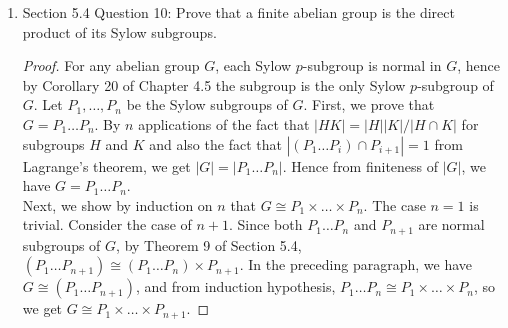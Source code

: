 \documentclass{article}
\begin{document}
\begin{enumerate}[label={\bf Q\arabic*:}]
\begin{proof}
      Now we prove the second assertion. If $|Z(P)|=p^3$, the group is
      cyclic. If $|Z(P)|=p^2$, then we have shown before that because
      $P/Z(P)$ is cyclic, $P$ will be abelian, which contradicts $Z(P)\neq
      P$. Hence assume $|Z(P)|=p$. Then from the earlier assertion, since
      the $p^{\text{th}}$ power map sends elements to $Z(P)$, the map is
      either surjective or trivial. If the map is trivial, then the kernel
      has order $p^3$. If the map is surjective, then from first
      isomorphism theorem, the kernel has order order $|P|/|Z(P)|=p^2$, as
      required. \\

      Squaring $D_8$ is not a homomorphism because $(sr)^2=srsr=1\neq r^2=
      s^2r^2$. \\

      Oddness of $p$ is used when showing that $(xy)^p=x^py^p$. In the
      prove above, there was a step that required 2 to divide $p-1$, which
      will not hold if $p=2$.
    \end{proof}

  \item Section 5.4 Question 10: Prove that a finite abelian group is the
    direct product of its Sylow subgroups.
    \begin{proof}
      For any abelian group $G$, each Sylow $p$-subgroup is normal in $G$,
      hence by Corollary 20 of Chapter 4.5 the subgroup is the only Sylow
      $p$-subgroup of $G$. Let $P_1,\ldots,P_n$ be the Sylow subgroups of
      $G$. First, we prove that $G=P_1\ldots P_n$. By $n$ applications of
      the fact that $|HK|=|H||K|/|H\cap K|$ for subgroups $H$ and $K$ and
      also the fact that $|(P_1\ldots P_i)\cap P_{i+1}|=1$ from Lagrange's
      theorem, we get $|G|=|P_1\ldots P_n|$. Hence from finiteness of
      $|G|$, we have $G=P_1\ldots P_n$. \\

      Next, we show by induction on $n$ that $G\cong P_1\times\ldots\times
      P_n$. The case $n=1$ is trivial. Consider the case of $n+1$. Since
      both $P_1\ldots P_n$ and $P_{n+1}$ are normal subgroups of $G$, by
      Theorem 9 of Section 5.4, $(P_1\ldots P_{n+1})\cong(P_1\ldots
      P_n)\times P_{n+1}$. In the preceding paragraph, we have $G\cong
      (P_1\ldots P_{n+1})$, and from
      induction hypothesis, $P_1\ldots P_n\cong P_1\times\ldots\times P_n$,
      so we get $G\cong P_1\times\ldots\times P_{n+1}$.
    \end{proof}


\end{enumerate}
\end{document}
